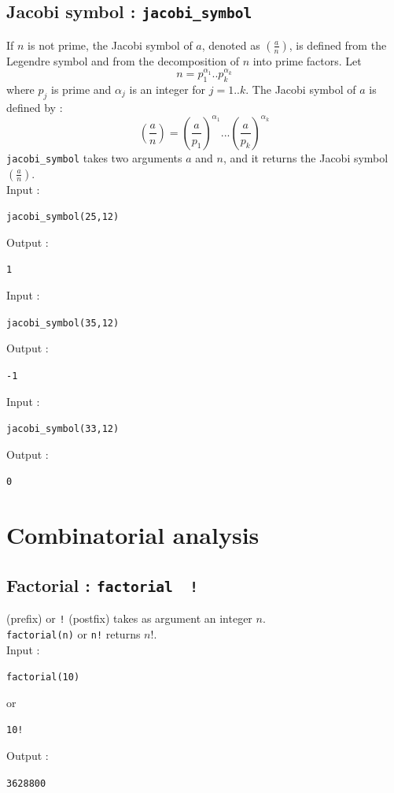 \documentclass[a4paper,11pt]{book}
\begin{document}
\subsection{Jacobi symbol  : {\tt jacobi\_symbol}}
If $n$ is not prime, the Jacobi symbol of $a$, 
denoted as $\left(\frac{a}{n}\right)$, is defined
from the Legendre symbol and from the
decomposition of $n$ into prime factors. 
Let 
\[ n=p_1^{\alpha _1}..p_k^{\alpha _k} \] 
where $p_j$ is prime and $\alpha _j$ is an integer for $j=1..k$.
The Jacobi symbol of $a$ is defined by :
\[ \left(\frac{a}{n}\right)=\left(\frac{a}{p_1}\right)^{\alpha _1}...\left(\frac{a}{p_k}\right)^{\alpha _k} \]
{\tt jacobi\_symbol} takes two arguments $a$ and $n$, and it returns the Jacobi
symbol $\left(\frac{a}{n}\right)$.\\
Input :
\begin{center}{\tt jacobi\_symbol(25,12)}\end{center}
Output :
\begin{center}{\tt 1}\end{center}
Input :
\begin{center}{\tt jacobi\_symbol(35,12)}\end{center}
Output :
\begin{center}{\tt -1}\end{center}
Input :
\begin{center}{\tt jacobi\_symbol(33,12)}\end{center}
Output :
\begin{center}{\tt 0}\end{center}

\section{Combinatorial analysis}
\subsection{Factorial : {\tt factorial \ !}}
 (prefix) or {\tt !} (postfix)
takes as argument an integer $n$.\\
{\tt factorial(n)} or {\tt n!} returns $n!$.\\
Input :
\begin{center}{\tt factorial(10)}\end{center}
or
\begin{center}{\tt 10!}\end{center}
Output :
\begin{center}{\tt 3628800}\end{center}
\end{document}
